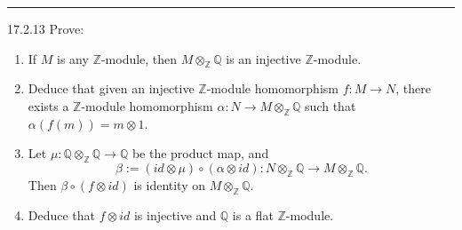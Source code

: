 \documentclass[a4paper, 12pt]{article}
\begin{document}
\noindent\rule{7in}{2.8pt}
\begin{problem}{17.2.13}
Prove:
\begin{enumerate}[(1)]
\item If \(M\) is any \(\mathbb{Z}\)-module, then \(M\otimes_{\mathbb{Z}}\mathbb{Q}\) is an injective \(\mathbb{Z}\)-module. 
\item Deduce that given an injective \(\mathbb{Z}\)-module homomorphism \(f:M\rightarrow N\), there exists a \(\mathbb{Z}\)-module homomorphism \(\alpha:N\rightarrow M\otimes_{\mathbb{Z}}\mathbb{Q}\) such that 
\(\alpha(f(m))=m\otimes 1\).
\item Let \(\mu:\mathbb{Q}\otimes_\mathbb{Z}\mathbb{Q}\rightarrow \mathbb{Q}\) be the product map, and 
\[\beta:=(id\otimes \mu)\circ (\alpha\otimes id):N\otimes_\mathbb{Z}\mathbb{Q}\rightarrow M\otimes_\mathbb{Z}\mathbb{Q}.\]
Then \(\beta\circ (f\otimes id)\) is identity on \(M\otimes_\mathbb{Z} \mathbb{Q}\). 
\item Deduce that \(f\otimes id\) is injective and \(\mathbb{Q}\) is a flat \(\mathbb{Z}\)-module.
\end{enumerate}
\end{problem}
\end{document}
